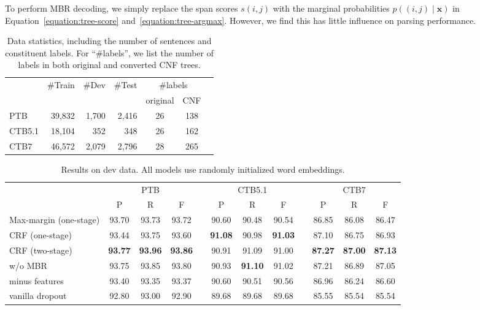 \documentclass{article}
\begin{document}
To perform MBR decoding, we simply replace the span scores $s(i,j)$ with the marginal probabilities $p((i,j)\mid\boldsymbol{x})$ in Equation~\ref{equation:tree-score} and~\ref{equation:tree-argmax}.
However, we find this has little influence on parsing performance. \begin{table}[tb]
\centering
\begin{tabular*}{\columnwidth}{@{\extracolsep{\fill}}lrrr|ccc}
\toprule
       & \multirow{2}{*}{\#Train} & \multirow{2}{*}{\#Dev} & \multirow{2}{*}{\#Test} & \multicolumn{2}{c}{\#labels} \\
       & & & & original & CNF \\[1pt]
       \midrule
PTB    &  39,832 & 1,700 &  2,416 & 26 &  138 \\
CTB5.1 &  18,104 &   352 &    348 & 26 &  162 \\
CTB7   &  46,572 & 2,079 &  2,796 & 28 &  265 \\
\bottomrule
\end{tabular*}
\caption{Data statistics, including the number of sentences and constituent labels. For ``\#labels'', we list the number of labels in both original and converted CNF trees.}
\label{table:statistics}
\end{table} \begin{table*}[tb]
\centering
\begin{tabular*}{\textwidth}{@{\extracolsep{\fill}}lccccccccccc}
\toprule
& \multicolumn{3}{c}{PTB} && \multicolumn{3}{c}{CTB5.1} && \multicolumn{3}{c}{CTB7} \\
& P & R & F && P & R & F && P & R & F \\
\midrule
Max-margin (one-stage) &         93.70  &         93.73  &         93.72  &&         90.60  &         90.48  &         90.54  &&         86.85  &         86.08  &         86.47  \\
CRF (one-stage)        &         93.44  &         93.75  &         93.60  && \textbf{91.08} &         90.98  & \textbf{91.03} &&         87.10  &         86.75  &         86.93  \\[3pt]
CRF (two-stage)        & \textbf{93.77} & \textbf{93.96} & \textbf{93.86} &&         90.91  &         91.09  &         91.00  && \textbf{87.27} & \textbf{87.00} & \textbf{87.13} \\
\qquad w/o MBR         &         93.75 &          93.85  &         93.80  &&         90.93  & \textbf{91.10} &         91.02  &&         87.21  &         86.89  &         87.05  \\
\qquad minus features  &         93.40  &         93.35  &         93.37  &&         90.60  &         90.51  &         90.56  &&         86.96  &         86.24  &         86.60  \\
\qquad vanilla dropout &         92.80  &         93.00  &         92.90  &&         89.68  &         89.68  &         89.68  &&         85.55  &         85.54  &         85.54  \\

\bottomrule
\end{tabular*}
\caption{Results on dev data. All models use randomly initialized word embeddings.}
\label{table:dev}
\end{table*} 
\end{document}
